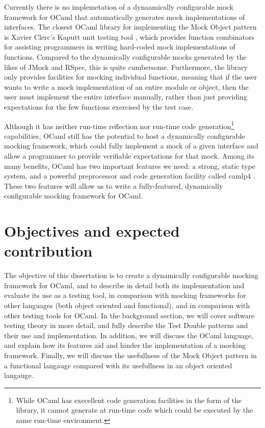 Currently there is no implemetation of a dynaamically configurable
mock framework for OCaml that automatically generates mock
implementations of interfaces. The closest OCaml library for
implementing the Mock Object pattern is Xavier Clerc's Kaputt unit
testing tool \cite{www:kaputt}, which provides function combinators
for assisting programmers in writing hard-coded mock implementations
of functions. Compared to the dynamically configurable mocks generated
by the likes of JMock and RSpec, this is quite
cumbersome. Furthermore, the library only provides facilities for
mocking individual functions, meaning that if the user wants to write
a mock implementation of an entire module or object, then the user
must implement the entire interface manually, rather than just
providing expectations for the few functions exercised by the test
case.

Although it has neither run-time reflection nor run-time code
generation\footnote{While OCaml has execellent code generation
  facilities in the form of the  library, it
  cannot generate at run-time code which could be executed by the same
  run-time environment.} capabilities, OCaml still has the potential
to host a dynamically configurable mocking framework, which could
fully implement a mock of a given interface and allow a programmer to
provide verifiable expectations for that mock. Among its many
benefits, OCaml has two important features we need: a strong, static
type system, and a powerful preprocessor and code generation facility
called camlp4 \cite{www:camlp4}. These two features will allow us to
write a fully-featured, dynamically configurable mocking framework for
OCaml.

\section{Objectives and expected contribution}

The objective of this dissertation is to create a dynamically
configurable mocking framework for OCaml, and to describe in detail
both its implementation and evaluate its use as a testing tool, in
comparison with mocking frameworks for other languages (both object
oriented and functional), and in comparison with other testing tools
for OCaml. In the background section, we will cover software testing
theory in more detail, and fully describe the Test Double patterns and
their use and implementation. In addition, we will discuss the OCaml
language, and explain how its features aid and hinder the
implementation of a mocking framework. Finally, we will discuss the
usefullness of the Mock Object pattern in a functional langauge
compared with its usefullness in an object oriented langauge.

